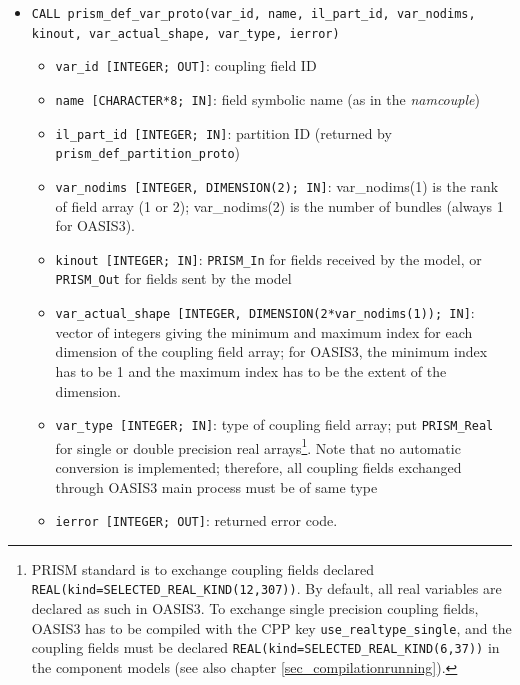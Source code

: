 \begin{itemize}

\item {\tt CALL prism\_def\_var\_proto(var\_id, name, il\_part\_id,
  var\_nodims, kinout, var\_actual\_shape, var\_type, ierror)}

\begin{itemize}
 \item {\tt var\_id [INTEGER; OUT]}: coupling field ID
 \item {\tt name [CHARACTER*8; IN]}: field symbolic name (as in the
   {\it namcouple})
 \item {\tt il\_part\_id [INTEGER; IN]}: partition ID (returned by
   {\tt prism\_def\_partition\-\_proto})
 \item {\tt var\_nodims [INTEGER, DIMENSION(2); IN]}: var\_nodims(1) is
   the rank of field array (1 or 2); var\_nodims(2) is the number of
   bundles (always 1 for OASIS3). 
 \item {\tt kinout [INTEGER; IN]}: {\tt PRISM\_In} for fields received by
   the model, or {\tt PRISM\_Out} for fields sent by the model 
 \item {\tt var\_actual\_shape [INTEGER, DIMENSION(2*var\_nodims(1)); IN]}: 
   vector of integers giving the minimum and maximum index for each
   dimension of the coupling field array; for OASIS3, the minimum
   index has to be 1 and the maximum index has to be the extent of the
   dimension.
 \item {\tt var\_type [INTEGER; IN]}: type of coupling field array;
   put {\tt PRISM\_Real} for single or double precision real
   arrays\footnote{PRISM standard is to exchange coupling fields
   declared {\tt REAL(kind=SELECTED\_REAL\_KIND(12,307))}. By default,
   all real variables are declared as such in OASIS3. To exchange
   single precision coupling fields, OASIS3 has to be compiled with
   the CPP key {\tt use\_realtype\_single}, and the coupling fields
   must be declared {\tt REAL(kind=SELECTED\_REAL\_KIND(6,37))} in the
   component models (see also chapter \ref{sec_compilationrunning}).}. 
   Note that no automatic conversion is implemented;
   therefore, all coupling fields exchanged through OASIS3 main
   process must be of same type
 \item {\tt ierror [INTEGER; OUT]}: returned error code. 
\end{itemize}
\end{itemize}

